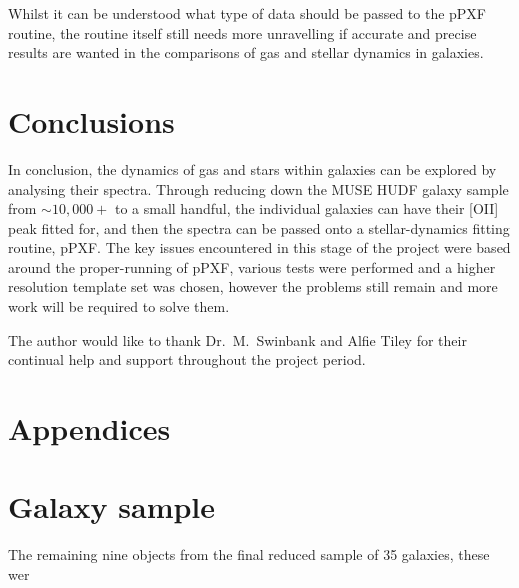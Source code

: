 \documentclass[12pt, twocolumn]{revtex4-1}    %
\begin{document}

Whilst it can be understood what type of data should be passed to the pPXF routine, the routine itself still needs more unravelling if accurate and precise results are wanted in the comparisons of gas and stellar dynamics in galaxies.


%

\section{Conclusions}
\noindent
In conclusion, the dynamics of gas and stars within galaxies can be explored by analysing their spectra. Through reducing down the MUSE HUDF galaxy sample from $\sim10,000+$ to a small handful, the individual galaxies can have their [OII] peak fitted for, and then the spectra can be passed onto a stellar-dynamics fitting routine, pPXF. The key issues encountered in this stage of the project were based around the proper-running of pPXF, various tests were performed and a higher resolution template set was chosen, however the problems still remain and more work will be required to solve them.

\begin{acknowledgments}
The author would like to thank Dr.~M.~Swinbank and Alfie Tiley for their continual help and support throughout the project period.
\end{acknowledgments}




\clearpage

\appendix

\onecolumngrid
\section*{Appendices}
\section{Galaxy sample} \label{appendix:rest_of_final_sample}
\noindent
The remaining nine objects from the final reduced sample of 35 galaxies, these wer
\end{document}
